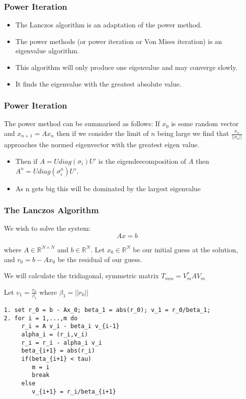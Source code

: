 \documentclass[pdf]{beamer}
\begin{document}
\begin{frame}
\frametitle{Power Iteration}
\begin{itemize}

\item The Lanczos algorithm is an adaptation of the power method.
\item The power methods (or power iteration or Von Mises iteration) is an eigenvalue algorithm.
\item This algorithm will only produce one eigenvalue and may converge slowly.
\item It finds the eigenvalue with the greatest absolute value.

\end{itemize}
\end{frame}

\begin{frame}
\frametitle{Power Iteration}

The power method can be summarised as follows: If $x_0$ is some random vector and $x_{n+1}=A x_n$ then if we consider the limit of $n$ being large we find that $\frac{x_n}{||x_n||}$ approaches the normed eigenvector with the greatest eigen value. 
\begin{itemize}
\item Then if $A=U {diag} (\sigma_i) U'$ is the eigendeecomposition of $A$ then $A^n = U {diag}(\sigma^n_i) U'$.
\item As n gets big this will be dominated by the largest eigenvalue
\end{itemize}
\end{frame}



\begin{frame}
\frametitle{The Lanczos Algorithm}

We wish to solve the system:
\[Ax=b\]

where $A \in \mathbb{R}^{N \times N}$ and $b \in \mathbb{R}^N$. Let $x_0 \in \mathbb{R}^N$ be our initial guess at the solution, and $r_0=b-Ax_0$ be the residual of our guess.

We will calculate the tridiagonal, symmetric matrix $T_{mm} = V_m^* A V_m$

Let $v_1=\frac{r_0}{\beta_1}$ where $\beta_1=||r_0||$

\end{frame}


\begin{frame}[fragile]

\begin{verbatim}
1. set r_0 = b - Ax_0; beta_1 = abs(r_0); v_1 = r_0/beta_1;
2. for i = 1,...,m do
     r_i = A v_i - beta_i v_{i-1}
     alpha_i = (r_i,v_i)
     r_i = r_i - alpha_i v_i
     beta_{i+1} = abs(r_i)
     if(beta_{i+1} < tau)
        m = i
        break
     else
        v_{i+1} = r_i/beta_{i+1}
\end{verbatim}



\end{frame}
\end{document}
